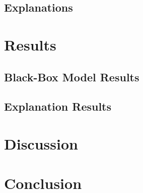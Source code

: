 \documentclass{article}
\begin{document}
		\subsection{Explanations}
	\section{Results}
		\subsection{Black-Box Model Results}
		\subsection{Explanation Results}
	\section{Discussion}
	\section{Conclusion}
	\newpage
	\printbibliography
\end{document}
